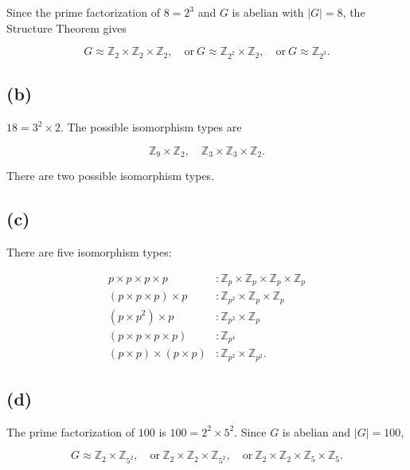 Since the prime factorization of \(8 = 2^{3}\) and \(G\) is abelian with \(|G| = 8\), the Structure Theorem gives

\[G \approx \mathbb{Z}_{2} \times \mathbb{Z}_{2} \times \mathbb{Z}_{2},\quad\text{or}\ G \approx \mathbb{Z}_{2^{2}} \times \mathbb{Z}_{2},\quad\text{or}\ G \approx \mathbb{Z}_{2^{3}}.\]

\subsection{(b)}

\(18 = 3^{2} \times 2\). The possible isomorphism types are

\[\mathbb{Z}_{9} \times \mathbb{Z}_{2},\quad\mathbb{Z}_{3} \times \mathbb{Z}_{3} \times \mathbb{Z}_{2}.\]

There are two possible isomorphism types.

\subsection{(c)}

There are five isomorphism types:

\[\begin{matrix}
{p \times p \times p \times p} & {:\mathbb{Z}_{p} \times \mathbb{Z}_{p} \times \mathbb{Z}_{p} \times \mathbb{Z}_{p}} \\
{\left( {p \times p \times p} \right) \times p} & {:\mathbb{Z}_{p^{2}} \times \mathbb{Z}_{p} \times \mathbb{Z}_{p}} \\
{\left( {p \times p^{2}} \right) \times p} & {:\mathbb{Z}_{p^{3}} \times \mathbb{Z}_{p}} \\
\left( {p \times p \times p \times p} \right) & {:\mathbb{Z}_{p^{4}}} \\
{\left( {p \times p} \right) \times \left( {p \times p} \right)} & {:\mathbb{Z}_{p^{2}} \times \mathbb{Z}_{p^{2}}.}
\end{matrix}\]

\subsection{(d)}

The prime factorization of \(100\) is \(100 = 2^{2} \times 5^{2}\). Since \(G\) is abelian and \(|G| = 100\),

\[G \approx \mathbb{Z}_{2} \times \mathbb{Z}_{5^{2}},\quad\text{or}\ \mathbb{Z}_{2} \times \mathbb{Z}_{2} \times \mathbb{Z}_{5^{2}},\quad\text{or}\ \mathbb{Z}_{2} \times \mathbb{Z}_{2} \times \mathbb{Z}_{5} \times \mathbb{Z}_{5}.\]

